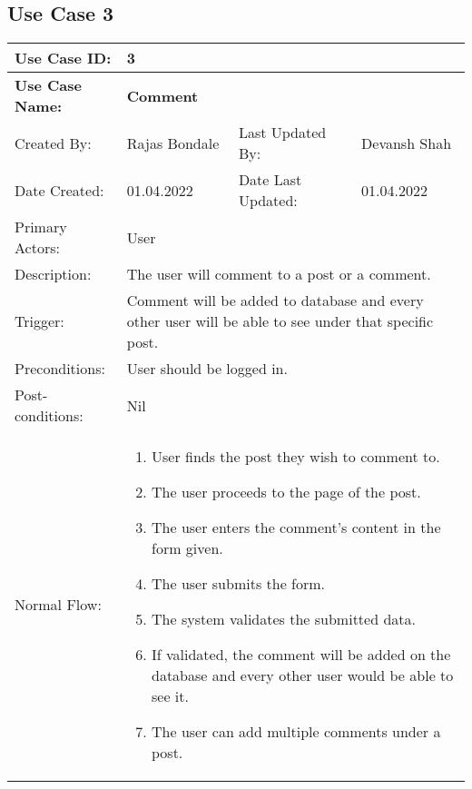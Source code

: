 \documentclass[12pt]{article}
\begin{document}
\subsection{Use Case 3}
\begin{center}
    \begin{longtable}{ | p{3cm} | p{3cm} | p{3cm} | p{3cm} | }
        \hline
        \textbf{Use Case ID:} & \multicolumn{3}{l|}{\textbf{3}} \\
        \hline
        \textbf{Use Case Name:} & \multicolumn{3}{l|}{\textbf{Comment}}\\
        \hline
         Created By: & Rajas Bondale & Last Updated By: & Devansh Shah \\
        \hline
        Date Created: & 01.04.2022 & Date Last Updated: & 01.04.2022 \\
        \hline
        Primary Actors: & \multicolumn{3}{l|}{User}\\
        \hline
        Description: & \multicolumn{3}{p{9cm}|}{The user will comment to a post or a comment.}\\
        \hline
        Trigger: & \multicolumn{3}{p{9cm}|}{Comment will be added to database and every other user will be able to see under that specific post.}\\
        \hline
        Preconditions: & \multicolumn{3}{p{9cm}|}{User should be logged in.}\\
        \hline
        Post-conditions: & \multicolumn{3}{p{9cm}|}{Nil}\\
        \hline
        Normal Flow: & \multicolumn{3}{p{9cm}|}{
            \begin{enumerate}
                \item User finds the post they wish to comment to. 
                \item The user proceeds to the page of the post.
                \item The user enters the comment's content in the form given.
                \item The user submits the form.
                \item The system validates the submitted data.
                \item If validated, the comment will be added on the database and every other user would be able to see it.
                \item The user can add multiple comments under a post.
            \end{enumerate}
        }\\

\end{longtable}
\end{center}
\end{document}
